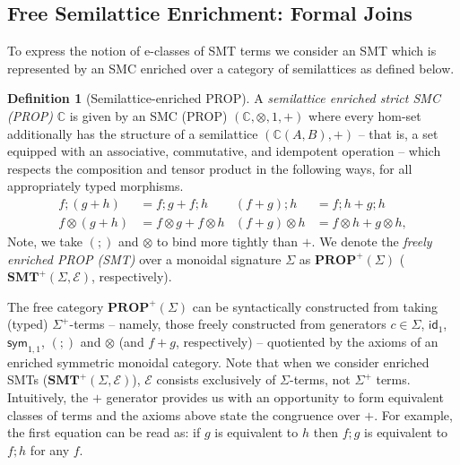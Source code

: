 \documentclass[sigconf, 9pt, nonacm]{acmart}
\theoremstyle{definition}
\newtheorem{definition}[thm]{Definition}
\newcommand\sym{\textsf{sym}}
\begin{document}
\subsection{Free Semilattice Enrichment: Formal Joins}

To express the notion of e-classes of SMT terms we consider an SMT which is represented by an SMC enriched over a category of semilattices as defined below.

\begin{definition}[Semilattice-enriched PROP]\label{def:enriched-prop}
A \textit{semilattice enriched strict SMC (PROP)}  $\mathbb{C}$ is given by an SMC (PROP) $(\mathbb{C}, \otimes, 1,+)$ where every hom-set additionally has the structure of a semilattice $(\mathbb{C}(A,B), +)$ -- that is,  a set equipped with an associative,  commutative,  and idempotent operation -- which respects the composition and tensor product in the following ways,  for all appropriately typed morphisms. 
\begin{align*}
f ; (g+h) &= f;g + f;h &
(f+g) ; h &= f;h + g;h \\
f \otimes (g+h) &= f \otimes g + f \otimes h & 
(f+g) \otimes h &= f \otimes h + g \otimes h,
\end{align*}
Note,  we take $(;\!)$ and $\otimes$ to bind more tightly than $+$.
We denote the \textit{freely enriched PROP (SMT)} over a monoidal signature $\Sigma$ as $\textbf{PROP}^+(\Sigma)$ ($\textbf{SMT}^+(\Sigma, \mathcal{E})$,  respectively).
\end{definition}

The free category $\textbf{PROP}^+(\Sigma)$ can be syntactically constructed from taking (typed) $\Sigma^+$-terms  -- namely, those freely constructed from generators $c \in \Sigma$, $\textsf{id}_1$, $\sym_{1,1}$, $(;\!)$ and $\otimes$ (and $f+g$, respectively) -- quotiented by the axioms of an enriched symmetric monoidal category.
Note that when we consider enriched SMTs ($\textbf{SMT}^{+}(\Sigma,\mathcal{E})$), $\mathcal{E}$ consists exclusively of $\Sigma$-terms, not $\Sigma^{+}$ terms.
Intuitively, the $+$ generator provides us with an opportunity to form equivalent classes of terms and the axioms above state the congruence over $+$.
For example, the first equation can be read as: if $g$ is equivalent to $h$ then $f;g$ is equivalent to $f;h$ for any $f$.
\end{document}
